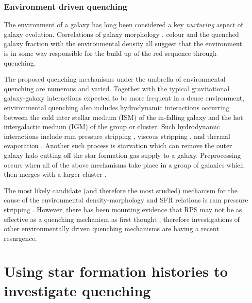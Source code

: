 \subsubsection{Environment driven quenching}\label{sec:envquench}

The environment of a galaxy has long been considered a key  \emph{nurturing} aspect of galaxy evolution. Correlations of galaxy morphology \citep{dressler80, smail97, poggianti99, postman05, Bamford09}, colour \citep{butcher78, pimbblet02} and the quenched galaxy fraction \citep{kauffmann03, Baldry06, peng12, darvish16} with the environmental density all suggest that the environment is in some way responsible for the build up of the red sequence through quenching. 

The proposed quenching mechanisms under the umbrella of environmental quenching are numerous and varied. Together with the typical gravitational galaxy-galaxy interactions \citep{moore96} expected to be more frequent in a dense environment, environmental quenching also includes hydrodynamic interactions occurring between the cold inter stellar medium (ISM) of the in-falling galaxy and the hot intergalactic medium (IGM) of the group or cluster. Such hydrodynamic interactions include ram pressure stripping \citep{gunngott72}, viscous stripping \citep{nulsen82}, and thermal evaporation \citep[a rapid rise in temperature of the ISM due to contact with the IGM;][]{cowie77}. Another such process is starvation \citep{larson80} which can remove the outer galaxy halo cutting off the star formation gas supply to a galaxy. Preprocessing occurs when all of the above mechanisms take place in a group of galaxies which then merges with a larger cluster \citep{dressler04}. 

The most likely candidate (and therefore the most studied) mechanism for the cause of the environmental density-morphology and SFR relations is ram pressure stripping \citep[RPS;][]{abadi99, poggianti99}. However, there has been mounting evidence that RPS may not be as effective as a quenching mechanism as first thought \citep{emerick16, fillingham16}, therefore investigations of other environmentally driven quenching mechanisms are having a recent resurgence. 

\section{Using star formation histories to investigate quenching}\label{sec:invquench}


